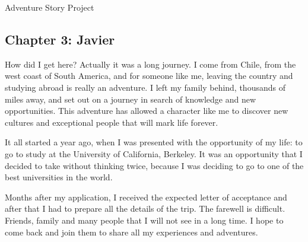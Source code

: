 \documentclass{article}
\begin{document}
\Huge Adventure Story Project

\normalsize

\subsection*{Chapter 3: Javier}

How did I get here? Actually it was a long journey. I come from Chile, from the west coast of South America, and for someone like me, leaving the country and studying abroad is really an adventure. I left my family behind, thousands of miles away, and set out on a journey in search of knowledge and new opportunities. This adventure has allowed a character like me to discover new cultures and exceptional people that will mark life forever.

It all started a year ago, when I was presented with the opportunity of my life: to go to study at the University of California, Berkeley. It was an opportunity that I decided to take without thinking twice, because I was deciding to go to one of the best universities in the world.

Months after my application, I received the expected letter of acceptance and after that I had to prepare all the details of the trip. The farewell is difficult. Friends, family and many people that I will not see in a long time. I hope to come back and join them to share all my experiences and adventures.
\end{document}
